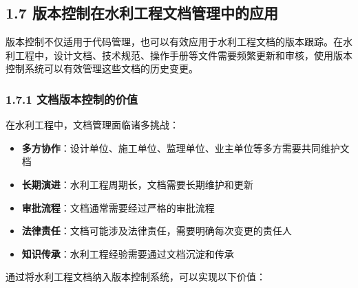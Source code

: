 \subsection{1.7
版本控制在水利工程文档管理中的应用}\label{ux7248ux672cux63a7ux5236ux5728ux6c34ux5229ux5de5ux7a0bux6587ux6863ux7ba1ux7406ux4e2dux7684ux5e94ux7528}

版本控制不仅适用于代码管理，也可以有效应用于水利工程文档的版本跟踪。在水利工程中，设计文档、技术规范、操作手册等文件需要频繁更新和审核，使用版本控制系统可以有效管理这些文档的历史变更。

\subsubsection{1.7.1
文档版本控制的价值}\label{ux6587ux6863ux7248ux672cux63a7ux5236ux7684ux4ef7ux503c}

在水利工程中，文档管理面临诸多挑战：

\begin{itemize}
\tightlist
\item
  \textbf{多方协作}：设计单位、施工单位、监理单位、业主单位等多方需要共同维护文档
\item
  \textbf{长期演进}：水利工程周期长，文档需要长期维护和更新
\item
  \textbf{审批流程}：文档通常需要经过严格的审批流程
\item
  \textbf{法律责任}：文档可能涉及法律责任，需要明确每次变更的责任人
\item
  \textbf{知识传承}：水利工程经验需要通过文档沉淀和传承
\end{itemize}

通过将水利工程文档纳入版本控制系统，可以实现以下价值：

